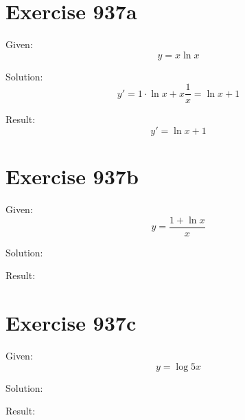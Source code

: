 \documentclass[a4paper, 10pt]{scrartcl}
\begin{document}
\section{Exercise 937a}

Given:
\[
y = x\ln{x}
\]

Solution:
\[
y' = 1\cdot\ln{x} + x\frac{1}{x} = \ln{x} + 1
\]

Result:
\[
y' = \ln{x} + 1
\]

\section{Exercise 937b}

Given:
\[
y = \frac{1 + \ln{x}}{x}
\]

Solution:

Result:

\section{Exercise 937c}

Given:
\[
y = \log{5x}
\]

Solution:

Result:
\end{document}
